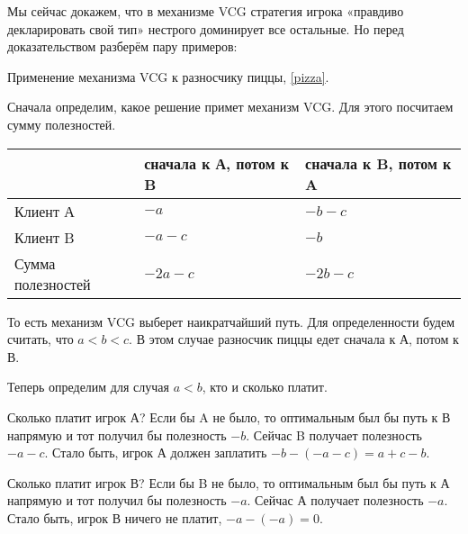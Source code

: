 Мы сейчас докажем, что в механизме VCG стратегия игрока «правдиво декларировать свой тип» нестрого доминирует все остальные. Но перед доказательством разберём пару примеров:

\begin{myex}
Применение механизма VCG к разносчику пиццы, \ref{pizza}.

Сначала определим, какое решение примет механизм VCG. Для этого посчитаем сумму полезностей.

\begin{tabular}{p{3 cm}|p{3 cm}p{3 cm}}
& сначала к А, потом к B & сначала к B, потом к A \\
\hline
Клиент А & $-a$ & $-b-c$ \\
Клиент B & $-a-c$ & $-b$ \\
Сумма полезностей& $-2a-c$ & $-2b-c$ \\
\end{tabular}

То есть механизм VCG выберет наикратчайший путь. Для определенности будем считать, что $ a<b<c $. В этом случае разносчик пиццы едет сначала к А, потом к В.

Теперь определим для случая $ a<b $, кто и сколько платит.

Сколько платит игрок А? Если бы A не было, то оптимальным был бы путь к В напрямую и тот получил бы полезность $ -b $. Сейчас B получает полезность $ -a-c $. Стало быть, игрок А должен заплатить $ -b-(-a-c)=a+c-b $.

Сколько платит игрок В? Если бы B не было, то оптимальным был бы путь к А напрямую и тот получил бы полезность $ -a $. Сейчас А получает полезность $ -a $. Стало быть, игрок В ничего не платит, $ -a-(-a)=0 $.
\end{myex}

